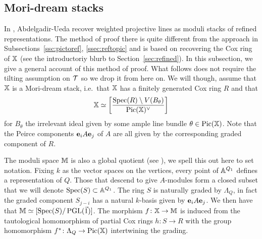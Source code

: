\documentclass[12pt]{amsart}
\begin{document}
\subsection{Mori-dream stacks}\label{ssec:nice}
In \cite{AU}, Abdelgadir-Ueda recover weighted projective lines as moduli stacks of refined representations. The method of proof there is quite different from the approach in Subsections~\ref{ssc:pictoref}, \ref{ssec:reftopic} and is based on recovering the Cox ring of $\mathbb{X}$ (see the introductoriy blurb to Section~\ref{sec:refined}). In this subsection, we give a general account of this method of proof. What follows does not require the tilting assumption on $\mathcal{T}$ so we drop it from here on. We will though, assume that $\mathbb{X}$ is a Mori-dream stack, i.e.\ that $\mathbb{X}$ has a finitely generated Cox ring $R$ and that $$\mathbb{X} \simeq \bigg[\frac{\operatorname{Spec}(R) \setminus V(B_\theta)}{\operatorname{Pic}(\mathbb{X})^\vee}\bigg]$$ for $B_\theta$ the irrelevant ideal given by some ample line bundle $\theta \in \operatorname{Pic}(\mathbb{X})$. Note that the Peirce components $\mathbf{e}_i A \mathbf{e}_j$ of $A$ are all given by the corresponding graded component of $R$. 

The moduli space $\mathbb{M}$ is also a global quotient (see \cite[Sections 4 \& 5]{Ki}), we spell this out here to set notation.
Fixing $k$ as the vector spaces on the vertices, every point of $\mathbb{A}^{Q_1}$ defines a representation of $Q$.
Those that descend to give $A$-modules form a closed subset that we will denote $\operatorname{Spec}(S) \subset \mathbb{A}^{Q_1}$.
The ring $S$ is naturally graded by $\Lambda_Q$, in fact the graded component $S_{j-i}$ has a natural $k$-basis given by $\mathbf{e}_i A \mathbf{e}_j$. 
We then have that $\mathbb{M} \simeq [\operatorname{Spec}(S)/\operatorname{PGL}(\vec{1})]$.
The morphism $f \colon \mathbb{X} \rightarrow \mathbb{M}$ is induced from the  tautological homomorphism of partial Cox rings $h \colon S \rightarrow R$ with the group homomorphism $f^* \colon \Lambda_Q \rightarrow \operatorname{Pic}(\mathbb{X})$ intertwining the grading.
\end{document}
